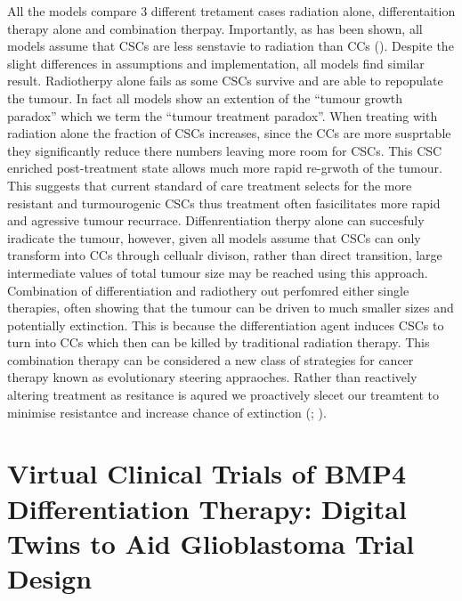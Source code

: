 \documentclass[
  letterpaper,
]{scrreprt}
\theoremstyle{definition}
\theoremstyle{remark}
\begin{document}
All the models compare 3 different tretament cases radiation alone,
differentaition therapy alone and combination therpay. Importantly, as
has been shown, all models assume that CSCs are less senstavie to
radiation than CCs (). Despite
the slight differences in assumptions and implementation, all models
find similar result. Radiotherpy alone fails as some CSCs survive and
are able to repopulate the tumour. In fact all models show an extention
of the ``tumour growth paradox'' which we term the ``tumour treatment
paradox''. When treating with radiation alone the fraction of CSCs
increases, since the CCs are more susprtable they significantly reduce
there numbers leaving more room for CSCs. This CSC enriched
post-treatment state allows much more rapid re-grwoth of the tumour.
This suggests that current standard of care treatment selects for the
more resistant and turmourogenic CSCs thus treatment often fasicilitates
more rapid and agressive tumour recurrace. Diffenrentiation therpy alone
can succesfuly iradicate the tumour, however, given all models assume
that CSCs can only transform into CCs through cellualr divison, rather
than direct transition, large intermediate values of total tumour size
may be reached using this approach. Combination of differentiation and
radiothery out perfomred either single therapies, often showing that the
tumour can be driven to much smaller sizes and potentially extinction.
This is because the differentiation agent induces CSCs to turn into CCs
which then can be killed by traditional radiation therapy. This
combination therapy can be considered a new class of strategies for
cancer therapy known as evolutionary steering appraoches. Rather than
reactively altering treatment as resitance is aqured we proactively
slecet our treamtent to minimise resistantce and increase chance of
extinction (; ).


\chapter{Virtual Clinical Trials of BMP4 Differentiation Therapy:
Digital Twins to Aid Glioblastoma Trial
Design}\label{virtual-clinical-trials-of-bmp4-differentiation-therapy-digital-twins-to-aid-glioblastoma-trial-design}
\end{document}
